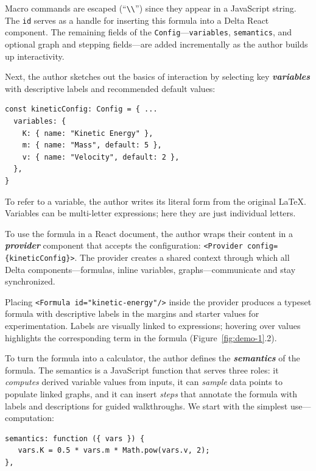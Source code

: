 Macro commands are escaped (``\texttt{\textbackslash{}\textbackslash{}}'') since they appear in a JavaScript string. The \texttt{id} serves as a handle for inserting this formula into a Delta React component. The remaining fields of the \texttt{Config}---\texttt{variables}, \texttt{semantics}, and optional graph and stepping fields---are added incrementally as the author builds up interactivity.

Next, the author sketches out the basics of interaction by selecting key \textbf{\emph{variables}} with descriptive labels and recommended default values:

\begin{tcolorbox}[codebox]
\begin{lstlisting}[style=jsstyle]
const kineticConfig: Config = { ...
  variables: {
    K: { name: "Kinetic Energy" },
    m: { name: "Mass", default: 5 },
    v: { name: "Velocity", default: 2 },
  },
}
\end{lstlisting}
\end{tcolorbox}

To refer to a variable, the author writes its literal form from the original LaTeX. Variables can be multi-letter expressions; here they are just individual letters.

To use the formula in a React document, the author wraps their content in a \textbf{\emph{provider}} component that accepts the configuration: \verb|<Provider config={kineticConfig}>|. The provider creates a shared context through which all Delta components---formulas, inline variables, graphs---communicate and stay synchronized.

Placing \verb|<Formula id="kinetic-energy"/>| inside the provider produces a typeset formula with descriptive labels in the margins and starter values for experimentation. Labels are visually linked to expressions; hovering over values highlights the corresponding term in the formula (Figure~\ref{fig:demo-1}.2).

To turn the formula into a calculator, the author defines the \textbf{\emph{semantics}} of the formula. The semantics is a JavaScript function that serves three roles: it \emph{computes} derived variable values from inputs, it can \emph{sample} data points to populate linked graphs, and it can insert \emph{steps} that annotate the formula with labels and descriptions for guided walkthroughs. We start with the simplest use---computation:

\begin{tcolorbox}[codebox]
\begin{lstlisting}[style=jsstyle]
semantics: function ({ vars }) {
   vars.K = 0.5 * vars.m * Math.pow(vars.v, 2);
},
\end{lstlisting}
\end{tcolorbox}

